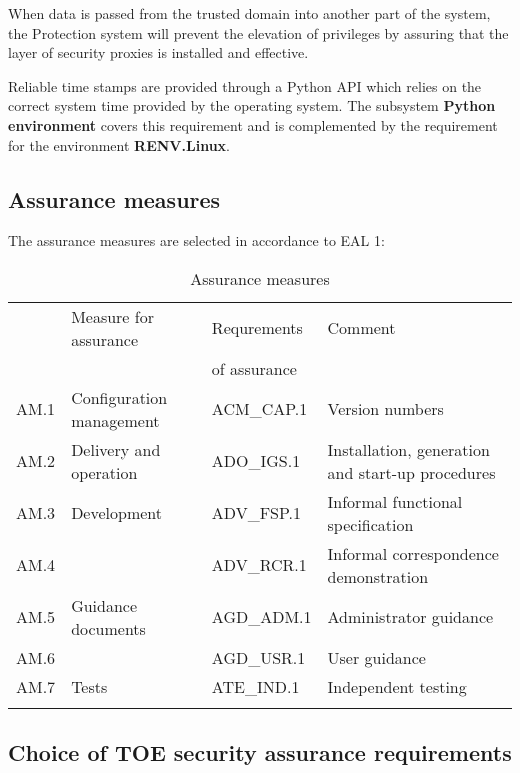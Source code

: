 \documentclass[12pt,english]{scrbook}
\begin{document}
When data is passed from the trusted domain into another part of the system,
the Protection system will prevent the elevation of privileges by assuring that
the layer of security proxies is installed and effective.


Reliable time stamps are provided through a Python API which relies on the
correct system time provided by the operating system. The subsystem
\textbf{Python environment} covers this requirement and is complemented by the
requirement for the environment \textbf{RENV.Linux}.

\subsection{Assurance measures}

The assurance measures are selected in accordance to EAL 1:

\begin{longtable}[c]{lllp{5cm}}
  \toprule
  & Measure for assurance & Requrements & Comment \\
  &                       & of assurance & \\
  \midrule\endhead

  AM.1 & Configuration management & ACM\_CAP.1 & Version numbers \\
  \midrule
  AM.2 & Delivery and operation & ADO\_IGS.1 & Installation, generation and start-up procedures \\
  \midrule
  AM.3 & Development            & ADV\_FSP.1 & Informal functional specification \\
  AM.4 &                        & ADV\_RCR.1 & Informal correspondence demonstration \\
  \midrule
  AM.5 & Guidance documents     & AGD\_ADM.1 & Administrator guidance \\
  AM.6 &                        & AGD\_USR.1 & User guidance \\
  \midrule
  AM.7 & Tests                  & ATE\_IND.1 & Independent testing  \\
  \bottomrule
  \caption{Assurance measures}
  \label{tab-assurance-measures}
\end{longtable}



\subsection{Choice of TOE security assurance requirements}
\end{document}
